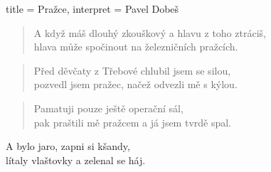 \begin{song}{
title = {Pražce}, 
interpret = {Pavel Dobeš}
}
\begin{verse}
A když máš dlouhý zkouškový a hlavu z toho ztráciš, \\
hlava může spočinout na železničních pražcích.
\end{verse}

\begin{verse}
Před děvčaty z Třebové chlubil jsem se silou, \\
pozvedl jsem pražec, načež odvezli mě s kýlou.
\end{verse}

\begin{verse}
Pamatuji pouze ještě operační sál, \\
pak praštili mě pražcem a já jsem tvrdě spal.
\end{verse} 
\begin{chorus}
A bylo jaro, zapni si kšandy, \\
lítaly vlaštovky a zelenal se háj.
\end{chorus}

\end{song}